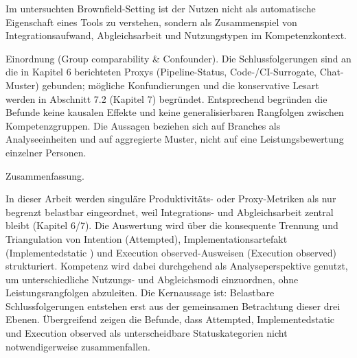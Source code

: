 Im untersuchten Brownfield-Setting ist der Nutzen nicht als automatische Eigenschaft eines Tools zu verstehen, sondern als Zusammenspiel von Integrationsaufwand, Abgleichsarbeit und Nutzungstypen im Kompetenzkontext.

\noindent Einordnung (Group comparability \& Confounder). Die Schlussfolgerungen sind an die in Kapitel 6 berichteten Proxys (Pipeline-Status, Code-/CI-Surrogate, Chat-Muster) gebunden; mögliche Konfundierungen und die konservative Lesart werden in Abschnitt 7.2 (Kapitel 7) begründet. Entsprechend begründen die Befunde keine kausalen Effekte und keine generalisierbaren Rangfolgen zwischen Kompetenzgruppen. Die Aussagen beziehen sich auf Branches als Analyseeinheiten und auf aggregierte Muster, nicht auf eine Leistungsbewertung einzelner Personen.

\noindent Zusammenfassung.

\noindent In dieser Arbeit werden singuläre Produktivitäts- oder Proxy-Metriken als nur begrenzt belastbar eingeordnet, weil Integrations- und Abgleichsarbeit zentral bleibt (Kapitel 6/7). Die Auswertung wird über die konsequente Trennung und Triangulation von Intention (Attempted), Implementationsartefakt (Implementedstatic ) und Execution observed-Ausweisen (Execution observed) strukturiert. Kompetenz wird dabei durchgehend als Analyseperspektive genutzt, um unterschiedliche Nutzungs- und Abgleichsmodi einzuordnen, ohne Leistungsrangfolgen abzuleiten. Die Kernaussage ist: Belastbare Schlussfolgerungen entstehen erst aus der gemeinsamen Betrachtung dieser drei Ebenen. Übergreifend zeigen die Befunde, dass Attempted, Implementedstatic und Execution observed als unterscheidbare Statuskategorien nicht notwendigerweise zusammenfallen.
